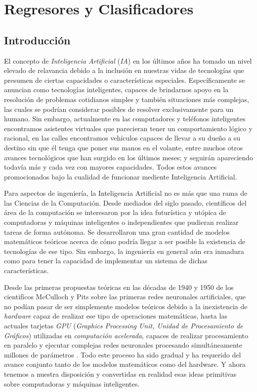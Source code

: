 \chapter{Regresores y Clasificadores}
\label{ch:ClasificadorRedes}

\section{Introducción}

El concepto de \textit{Inteligencia Artificial} (\textit{IA}) en los últimos años ha tomado un nivel elevado de relavancia debido a la inclusión en nuestras vidas de tecnologías que presumen de ciertas 
capacidades o características especiales. Específicamente se anuncian como tecnologías inteligentes, capaces de brindarnos apoyo en la resolución de problemas cotidianos simples y también situaciones más complejas, las 
cuales se podrían considerar posibles de resolver exclusivamente para un humano. Sin embargo, actualmente en las computadores y teléfonos inteligentes encontramos asistentes virtuales que parecieran tener un comportamiento 
lógico y racional, en las calles encontramos vehículos capaces de llevar a su dueño a su destino sin que él tenga que poner sus manos en el volante, entre muchos otros avances tecnológicos que han surgido en los últimos 
meses; y seguirán apareciendo todavía más y cada vez con mayores capacidades. Todos estos avances promocionados bajo la cualidad de funcionar mediente Inteligencia Artificial.

Para aspectos de ingeniería, la Inteligencia Artificial no es más que una rama de las Ciencias de la Computación. Desde mediados del siglo pasado, científicos del área de la computación se interesaron por la idea futurística 
y utópica de computadoras y máquinas inteligentes o independientes que pudieran realizar tareas de forma autónoma. Se desarrollaron una gran cantidad de modelos matemáticos teóricos acerca de cómo podría llegar a ser posible 
la existencia de tecnologías de ese tipo. Sin embargo, la ingeniería en general aún era inmadura como para tener la capacidad de implementar un sistema de dichas características.

Desde las primeras propuestas teóricas en las décadas de 1940 y 1950 de los cientifícos McCulloch y Pits sobre las primeras redes neuronales artificiales, que no podían pasar de ser simplemente modelos teóricos debido a la 
inexistencia de \textit{hardware} capaz de realizar ese tipo de operaciones matemáticas, hasta las actuales tarjetas \textit{GPU} (\textit{Graphics Processing Unit, Unidad de Procesamiento de Gráficos}) utilizadas en 
\textit{computación acelerada}, capaces de realizar procesamiento en paralelo y ejecutar complejas redes neuronales procesando simultáneamente millones de parámetros \cite{gpuHP} \cite{gpuNVIDIA}. Todo este proceso ha sido gradual y ha requerido del 
avance conjunto tanto de los modelos matemáticos como del hardware. Y ahora tenemos a nuestra disposición y convertidas en realidad esas ideas primitivas sobre computadoras y máquinas inteligentes.

